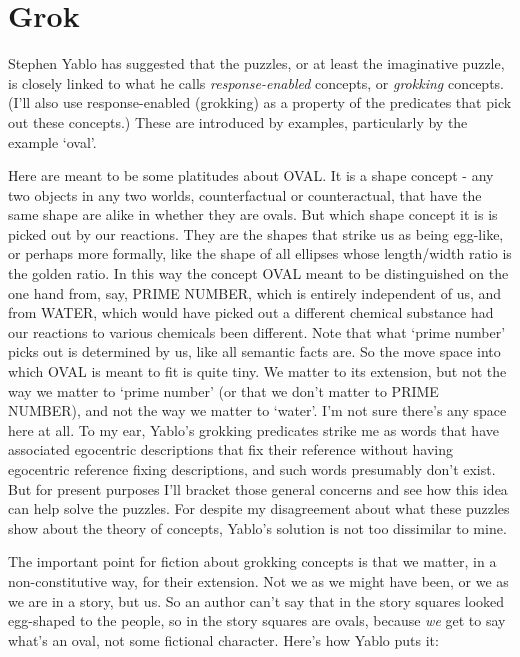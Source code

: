 \documentclass[
  10pt,
  letterpaper,
  DIV=11,
  numbers=noendperiod,
  twoside]{scrartcl}
\begin{document}
\section{Grok}\label{grok}

Stephen Yablo has suggested that the puzzles, or at least the
imaginative puzzle, is closely linked to what he calls
\emph{response-enabled} concepts, or \emph{grokking} concepts. (I'll
also use response-enabled (grokking) as a property of the predicates
that pick out these concepts.) These are introduced by examples,
particularly by the example `oval'.

Here are meant to be some platitudes about OVAL. It is a shape concept -
any two objects in any two worlds, counterfactual or counteractual, that
have the same shape are alike in whether they are ovals. But which shape
concept it is is picked out by our reactions. They are the shapes that
strike us as being egg-like, or perhaps more formally, like the shape of
all ellipses whose length/width ratio is the golden ratio. In this way
the concept OVAL meant to be distinguished on the one hand from, say,
PRIME NUMBER, which is entirely independent of us, and from WATER, which
would have picked out a different chemical substance had our reactions
to various chemicals been different. Note that what `prime number' picks
out is determined by us, like all semantic facts are. So the move space
into which OVAL is meant to fit is quite tiny. We matter to its
extension, but not the way we matter to `prime number' (or that we don't
matter to PRIME NUMBER), and not the way we matter to `water'. I'm not
sure there's any space here at all. To my ear, Yablo's grokking
predicates strike me as words that have associated egocentric
descriptions that fix their reference without having egocentric
reference fixing descriptions, and such words presumably don't exist.
But for present purposes I'll bracket those general concerns and see how
this idea can help solve the puzzles. For despite my disagreement about
what these puzzles show about the theory of concepts, Yablo's solution
is not too dissimilar to mine.

The important point for fiction about grokking concepts is that we
matter, in a non-constitutive way, for their extension. Not we as we
might have been, or we as we are in a story, but us. So an author can't
say that in the story squares looked egg-shaped to the people, so in the
story squares are ovals, because \emph{we} get to say what's an oval,
not some fictional character. Here's how Yablo puts it:
\end{document}
